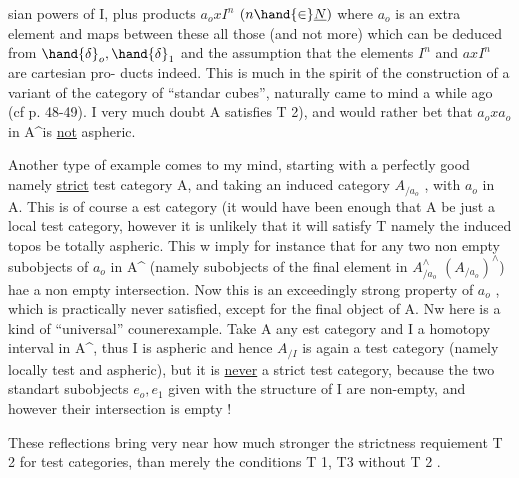 sian powers of I, plus products $a_{o}xI^{n}$ $(n\hand{\in}\underline{N})$  where $a_{o}$ is an extra element\hand{,}
and  maps between these all those (and not more) which can be deduced from
$\hand{\delta}_{o},\hand{\delta}_{1}$ and the assumption that the elements $I^{n}$ and $axI^{n}$ are cartesian pro-%
ducts indeed. This is much in the spirit of the construction of a variant
of the category \hand{$\square$} of ``standar cubes'',  naturally came to mind
a while ago (cf p. 48-49). I very much doubt A satisfies T 2), and would
rather bet that $a_{o}xa_{o}$ in A\^{}is \uline{not} aspheric.

Another type of example comes to my mind, starting with a perfectly
good \hand{(}namely \uline{strict}\hand{)} test category A, and taking an induced category
$A_{/a_{o}}$ , with $a_{o}$ in A. This is of course a est category (it would have been
enough that A be just a local test category\hand{)}, however it is unlikely that
it will satisfy T namely the induced topos be totally aspheric. This
w imply for instance that for any two  non empty subobjects of
$a_{o}$ in A\^{} (namely subobjects of the final element in $A^{\wedge}_{/a_{o}}$ \hand{$\simeq$} $(A_{/a_{o}})^{\wedge}$) hae a
non empty intersection. Now this is an exceedingly strong property of $a_{o}$ ,
which is practically never satisfied, except for the final object of A.
Nw here is a kind of ``universal'' counerexample. Take A any est category
and I a homotopy interval in A\^{}, thus I is aspheric and hence $A_{/I}$ is
again a test category (namely locally test and aspheric), but it is \uline{never}
a strict test category, because the two standart subobjects $e_{o},e_{1}$ given
with the structure of I are non-empty, and however their intersection is
\margin{$\uparrow$}empty !

These reflections bring very near how much stronger the  strictness
requiement T 2 for test categories, than merely the conditions T 1, T3
without T 2 .

